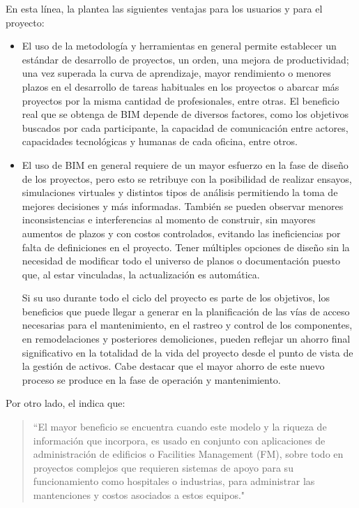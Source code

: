 En esta línea, la  plantea las siguientes ventajas para los usuarios y para el proyecto:

\begin{itemize}
    \item El uso de la metodología y herramientas en general permite establecer un estándar de desarrollo de proyectos, un orden, una mejora de productividad; una vez superada la curva de aprendizaje, mayor rendimiento o menores plazos en el desarrollo de tareas habituales en los proyectos o abarcar más proyectos por la misma cantidad de profesionales, entre otras. El beneficio real que se obtenga de BIM depende de diversos factores, como los objetivos buscados por cada participante, la capacidad de comunicación entre actores, capacidades tecnológicas y humanas de cada oficina, entre otros.
    \item {El uso de BIM en general requiere de un mayor esfuerzo en la fase de diseño de los proyectos, pero esto se retribuye con la posibilidad de realizar ensayos, simulaciones virtuales y distintos tipos de análisis permitiendo la toma de mejores decisiones y más informadas. También se pueden observar menores inconsistencias e interferencias al momento de construir, sin mayores aumentos de plazos y con costos controlados, evitando las ineficiencias por falta de definiciones en el proyecto. Tener múltiples opciones de diseño sin la necesidad de modificar todo el universo de planos o documentación puesto que, al estar vinculadas, la actualización es automática.
    
    Si su uso durante todo el ciclo del proyecto es parte de los objetivos, los beneficios que puede llegar a generar en la planificación de las vías de acceso necesarias para el mantenimiento, en el rastreo y control de los componentes, en remodelaciones y posteriores demoliciones, pueden reflejar un ahorro final significativo en la totalidad de la vida del proyecto desde el punto de vista de la gestión de activos. Cabe destacar que el mayor ahorro de este nuevo proceso se produce en la fase de operación y mantenimiento.}
\end{itemize}

Por otro lado, el  indica que:

\begin{quote}
    ``El mayor beneficio se encuentra cuando este modelo y la riqueza de información que incorpora, es usado en conjunto con aplicaciones de administración de edificios o Facilities Management (FM), sobre todo en proyectos complejos que requieren sistemas de apoyo para su funcionamiento como hospitales o industrias, para administrar las mantenciones y costos asociados a estos equipos."    
\end{quote}

